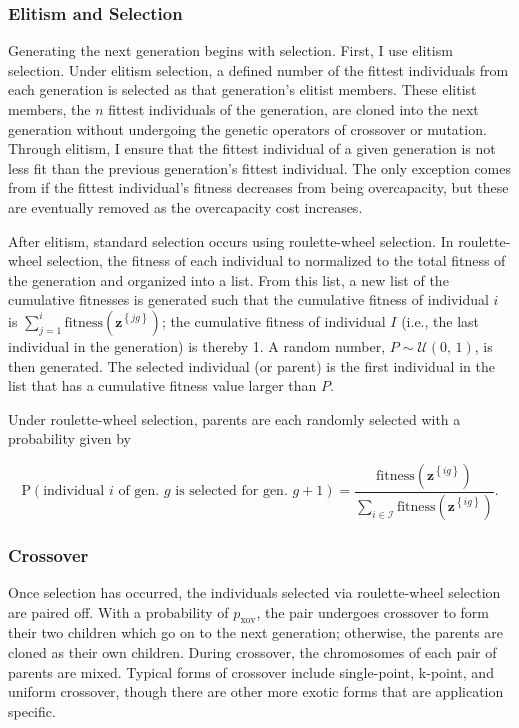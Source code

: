 \documentclass[12pt,dvipsnames]{report}
\begin{document}
\subsubsection{Elitism and Selection}

Generating the next generation begins with selection.  First, I use elitism selection.  Under elitism selection, a defined number of the fittest individuals from each generation is selected as that generation's elitist members.  These elitist members, the $n$ fittest individuals of the generation, are cloned into the next generation without undergoing the genetic operators of crossover or mutation.  Through elitism, I ensure that the fittest individual of a given generation is not less fit than the previous generation's fittest individual.  The only exception comes from if the fittest individual's fitness decreases from being overcapacity, but these are eventually removed as the overcapacity cost increases.

After elitism, standard selection occurs using roulette-wheel selection.  In roulette-wheel selection, the fitness of each individual to normalized to the total fitness of the generation and organized into a list.  From this list, a new list of the cumulative fitnesses is generated such that the cumulative fitness of individual $i$ is $\sum_{j = 1}^i \text{fitness} \left( \textbf{z}^{\left\{ jg \right\}} \right)$; the cumulative fitness of individual $I$ (i.e., the last individual in the generation) is thereby 1.  A random number, $P \sim \mathcal{U} \left( 0,\, 1 \right)$, is then generated.  The selected individual (or parent) is the first individual in the list that has a cumulative fitness value larger than $P$.

Under roulette-wheel selection, parents are each randomly selected with a probability given by

\begin{equation}
	\text{P}\left( \text{individual $i$ of gen. $g$ is selected for gen. $g+1$} \right) = \frac{\text{fitness}\left( \textbf{z}^{\left\{ ig \right\}} \right)}{\sum_{i \in \mathcal{I}} \text{fitness}\left( \textbf{z}^{\left\{ ig \right\}} \right)}.
\end{equation}

\subsubsection{Crossover}

Once selection has occurred, the individuals selected via roulette-wheel selection are paired off.  With a probability of $p_{\text{xov}}$, the pair undergoes crossover to form their two children which go on to the next generation; otherwise, the parents are cloned as their own children.  During crossover, the chromosomes of each pair of parents are mixed.  Typical forms of crossover include single-point, k-point, and uniform crossover, though there are other more exotic forms that are application specific.
\end{document}
